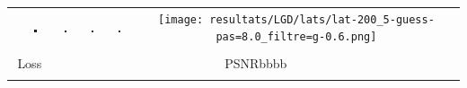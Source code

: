 \begin{tabular}{c c c c c c}
	
	&
	\includegraphics[width=0.12\textwidth]{resultats/LGD/lats/lat-200_1-guess-pas=8.0_filtre=g-0.6.png}
	&
	\includegraphics[width=0.12\textwidth]{resultats/LGD/lats/lat-200_2-guess-pas=8.0_filtre=g-0.6.png}
	&
	\includegraphics[width=0.12\textwidth]{resultats/LGD/lats/lat-200_3-guess-pas=8.0_filtre=g-0.6.png}
	&
	\includegraphics[width=0.12\textwidth]{resultats/LGD/lats/lat-200_4-guess-pas=8.0_filtre=g-0.6.png}
	&
	\texttt{[image: resultats/LGD/lats/lat-200\_5-guess-pas=8.0\_filtre=g-0.6.png]}
	
	\\ \\
	
	
	
	\multicolumn{2}{c}{Loss}  &  \multicolumn{4}{c}{PSNR{\color{white}bbbb}}
	
	\\
	
	\multicolumn{2}{c}{}
	&
	\multicolumn{4}{c}{}
\end{tabular}